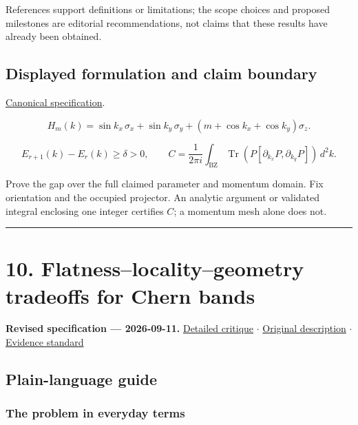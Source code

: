 \documentclass[
  11pt,
]{article}
\begin{document}
References support definitions or limitations; the scope choices and
proposed milestones are editorial recommendations, not claims that these
results have already been obtained.

\subsection{Displayed formulation and claim boundary}

\href{https://github.com/rick-stevens-ai/Pure-Thought/blob/main/PRDs/09-Topological-Band-Theory.md}{Canonical
specification}.

\[H_m(k)=\sin k_x\,\sigma_x+\sin k_y\,\sigma_y+
(m+\cos k_x+\cos k_y)\sigma_z.\]

\[E_{r+1}(k)-E_r(k)\ge\delta>0,\qquad
C=\frac{1}{2\pi i}\int_{\mathrm{BZ}}
\operatorname{Tr}\!\left(P[\partial_{k_x}P,\partial_{k_y}P]\right)\,d^2k.\]

Prove the gap over the full claimed parameter and momentum domain. Fix
orientation and the occupied projector. An analytic argument or
validated integral enclosing one integer certifies \(C\); a momentum
mesh alone does not.

\begin{center}\rule{0.5\linewidth}{0.5pt}\end{center}

\section{10. Flatness--locality--geometry tradeoffs for Chern bands}

\textbf{Revised specification --- 2026-09-11.}
\href{https://github.com/rick-stevens-ai/Pure-Thought/blob/main/reviews/10-Flat-Chern-Bands.md}{Detailed
critique} \ensuremath{\cdot}
\href{https://github.com/rick-stevens-ai/Pure-Thought/blob/main/archive/original-PRDs/10-Flat-Chern-Bands.md}{Original
description} \ensuremath{\cdot}
\href{https://github.com/rick-stevens-ai/Pure-Thought/blob/main/reviews/EVIDENCE-STANDARD.md}{Evidence
standard}

\subsection{Plain-language guide}

\subsubsection{The problem in everyday terms}
\end{document}
